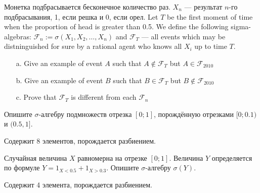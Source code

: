 \begin{problem}
Монетка подбрасывается бесконечное количество раз. $ X_{n} $ — результат $ n $-го подбрасывания, 1, если решка и 0, если орел. Let $T$ be the first moment of time when the proportion of head is greater than 0.5. We define the following sigma-algebras: $ \mathcal{F}_{n}:=\sigma(X_{1},X_{2},\ldots,X_{n})$ and $ \mathcal{F}_{T} $ — all events which may be distninguished for sure by a rational agent who knows all $ X_{i} $ up to time $ T $.
\begin{enumerate}
\item[a.] Give an example of event $A$ such that $ A\notin \mathcal{F}_{T} $ but $ A\in \mathcal{F}_{2010} $
\item[b.] Give an example of event $B$ such that $ B\in \mathcal{F}_{T} $ but $ B\notin \mathcal{F}_{2010} $
\item[c.] Prove that $ \mathcal{F}_{T} $ is different from each $ \mathcal{F}_{n} $
\end{enumerate}


\begin{sol}

\end{sol}
\end{problem}

\begin{problem}
Опишите $\sigma$-алгебру подмножеств отрезка $[0;1]$, порождённую отрезками $[0;0.1)$ и $(0.5,1]$.

\begin{sol}
Содержит 8 элементов, порождается разбиением.
\end{sol}
\end{problem}

\begin{problem}
Случайная величина $X$ равномерна на отрезке $[0;1]$. 
Величина $Y$ определяется по формуле $Y=1_{X<0.5}+1_{X>0.3}$. 
Опишите $\sigma$-алгебру $\sigma(Y)$.

\begin{sol}
Содержит 4 элемента, порождается разбиением.
\end{sol}
\end{problem}


